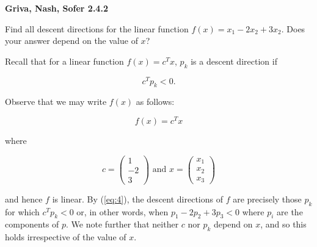 \textbf{Griva, Nash, Sofer 2.4.2}

Find all descent directions for the linear function $f(x) = x_1 - 2x_2 + 3x_2$. Does your
answer depend on the value of $x$?

\begin{solution}
  Recall that for a linear function $f(x) = c^Tx$, $p_k$ is a descent direction if

  \begin{equation}\label{eq:4}
    c^T p_k < 0.
  \end{equation}

  Observe that we may write $f(x)$ as follows:

  $$
  f(x) = c^T x
  $$
  
  where
  
  $$
  c = \begin{pmatrix}
     1 \\
    -2 \\
     3
  \end{pmatrix}
  \text{ and }
  x = \begin{pmatrix}
    x_1 \\
    x_2 \\
    x_3
  \end{pmatrix}
  $$

  and hence $f$ is linear. By (\ref{eq:4}), the descent directions of $f$ 
  are precisely those $p_k$ for which $c^T p_k < 0$ or, in other words, when 
  $p_1 - 2p_2 + 3p_3 < 0$ where $p_i$ are the components of $p$. We note 
  further that neither $c$ nor $p_k$ depend on $x$, and so this holds  
  irrespective of the value of $x$.
  \ \\
\end{solution}